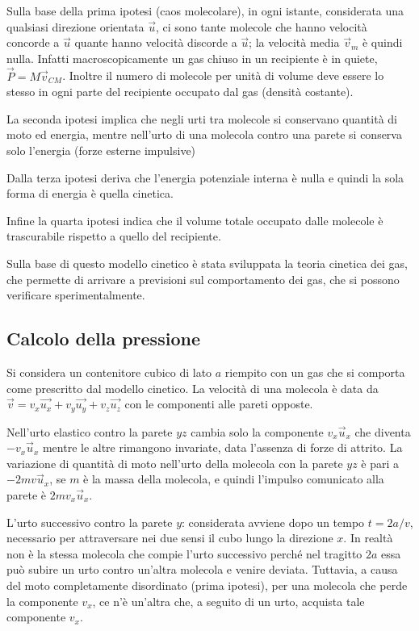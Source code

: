 \documentclass[class=book, crop=false, oneside, 12pt]{standalone}
\begin{document}
Sulla base della prima ipotesi (caos molecolare), in ogni istante, considerata una qualsiasi direzione orientata \(\overrightarrow{u}\), ci sono tante molecole che hanno velocità concorde a \(\overrightarrow{u}\) quante hanno velocità discorde a \(\overrightarrow{u}\); la velocità media \(\overrightarrow{v}_m\) è quindi nulla. 
Infatti macroscopicamente un gas chiuso in un recipiente è in quiete, \(\overrightarrow{P} = M \overrightarrow{v}_{CM}\). 
Inoltre il numero di molecole per unità di volume deve essere lo stesso in ogni parte del recipiente occupato dal gas (densità costante).

La seconda ipotesi implica che negli urti tra molecole si conservano quantità di moto ed energia, mentre nell'urto di una molecola contro una parete si conserva solo l'energia (forze esterne impulsive)

Dalla terza ipotesi deriva che l'energia potenziale interna è nulla e quindi la sola forma di energia è quella cinetica.

Infine la quarta ipotesi indica che il volume totale occupato dalle molecole è trascurabile rispetto a quello del recipiente.

Sulla base di questo modello cinetico è stata sviluppata la teoria cinetica dei gas, che permette di arrivare a previsioni sul comportamento dei gas, che si possono verificare sperimentalmente.

\subsection{Calcolo della pressione}

Si considera un contenitore cubico di lato \(a\) riempito con un gas che si comporta come prescritto dal modello cinetico. 
La velocità di una molecola è data da \(\overrightarrow{v} = v_x \overrightarrow{u_x} + v_y \overrightarrow{u_y} + v_z \overrightarrow{u_z}\) con le componenti alle pareti opposte.

Nell'urto elastico contro la parete \(y z\) cambia solo la componente \(v_x \overrightarrow{u}_x\) che diventa \(-v_x \overrightarrow{u}_x\) mentre le altre rimangono invariate, data l'assenza di forze di attrito.
La variazione di quantità di moto nell'urto della molecola con la parete \(y z\) è pari a \(-2 m v \overrightarrow{u}_x\), se \(m\) è la massa della molecola, e quindi l'impulso comunicato alla parete è \(2 m v_x \overrightarrow{u}_x\).

L'urto successivo contro la parete \(y\): considerata avviene dopo un tempo \(t = 2a / v\), necessario per attraversare nei due sensi il cubo lungo la direzione \(x\). 
In realtà non è la stessa molecola che compie l'urto successivo perché nel tragitto \(2a\) essa può subire un urto contro un'altra molecola e venire deviata. 
Tuttavia, a causa del moto completamente disordinato (prima ipotesi), per una molecola che perde la componente \(v_x\), ce n'è un'altra che, a seguito di un urto, acquista tale componente \(v_x\). 
\end{document}
